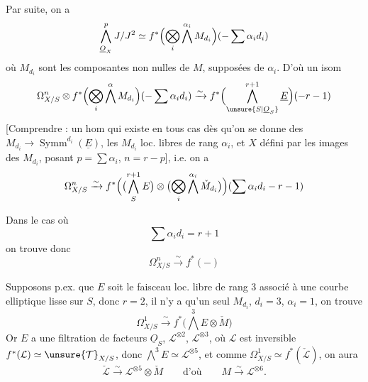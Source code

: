 
Par suite, on a
\[
\bigwedge_{\underline O_X}^p J/J^2\simeq
f^*\Bigl(\bigotimes_i\bigwedge^{\alpha_i}M_{d_i}\Bigr)(-\sum\alpha_i d_i)
\]
où $M_{d_i}$ sont les composantes non nulles de $M$, supposées
de  $\alpha_i$. D'où un isom
\[
\Omega^n_{X/S}\otimes f^*\Bigl(\bigotimes_i\bigwedge^{\alpha}M_{d_i}\Bigr)(-\sum\alpha_i d_i)
\xrightarrow{\sim}f^*\Bigl(\bigwedge_{\unsure{S|\underline O_S}}^{r+1}\underline E\Bigr)(-r-1)
\]
[Comprendre : un hom qui existe en tous cas dès
qu'on se donne des $M_{d_i}\to\operatorname{Symm}^{d_i}(\underline E)$, les $M_{d_i}$ loc.
libres de rang $\alpha_i$, et $X$ défini par
 les images
des $M_{d_i}$, posant $p=\sum\alpha_i$, $n=r-p$], i.e. on a
\[
\Omega^n_{X/S}\xrightarrow{\sim}
f^*\Bigl(\bigl(\bigwedge_S^{r+1}E\bigr)\otimes
\bigl(\bigotimes_i\bigwedge^{\alpha_i}\check M_{d_i}\bigr)\Bigr)
(\sum\alpha_i d_i-r-1)
\]

Dans le cas où
\[
\sum\alpha_i d_i=r+1
\]
on trouve donc
\[
\Omega^n_{X/S}\xrightarrow{\sim}f^*(-)
\]

Supposons p.ex. que $E$ soit le faisceau loc. libre de
rang $3$ associé à une courbe elliptique lisse
sur $S$, donc $r=2$, il n'y a qu'un seul $M_{d_i}$, $d_i=3$,
$\alpha_i=1$, on trouve
\[
\Omega^1_{X/S}\xrightarrow{\sim}f^*\bigl(\bigwedge^3E\otimes\check M\bigr)
\]
Or $E$ a une filtration de facteurs $\underline O_S$,
 $\mathcal L^{\otimes2}$, $\mathcal L^{\otimes3}$,
où $\mathcal L$ est inversible 
$f^*(\mathcal L)\simeq\unsure{\mathcal T}_{X/S}$, donc
$\bigwedge^3E\simeq\mathcal L^{\otimes5}$, et comme
$\Omega^1_{X/S}\simeq f^*(\check{\mathcal L})$, on aura
\[
\check{\mathcal L}\xrightarrow{\sim}\mathcal L^{\otimes5}\otimes\check M
\qquad\text{d'où}\qquad M\xrightarrow{\sim}\mathcal L^{\otimes6}.
\]

